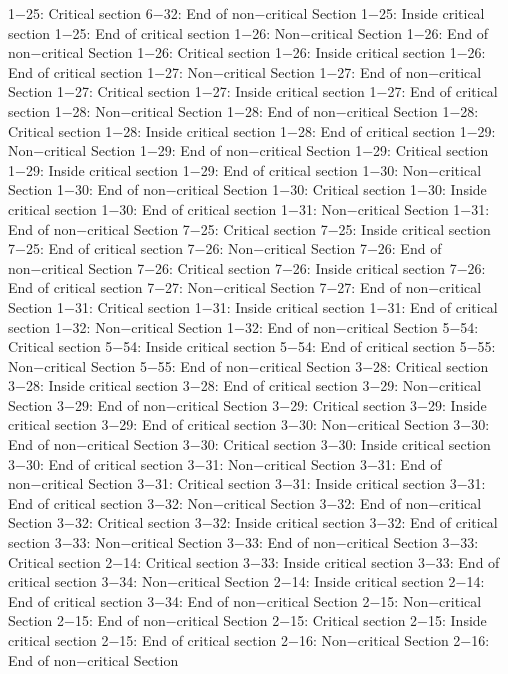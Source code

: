 1−25: Critical section
6−32: End of non−critical Section
1−25: Inside critical section
1−25: End of critical section
1−26: Non−critical Section
1−26: End of non−critical Section
1−26: Critical section
1−26: Inside critical section
1−26: End of critical section
1−27: Non−critical Section
1−27: End of non−critical Section
1−27: Critical section
1−27: Inside critical section
1−27: End of critical section
1−28: Non−critical Section
1−28: End of non−critical Section
1−28: Critical section
1−28: Inside critical section
1−28: End of critical section
1−29: Non−critical Section
1−29: End of non−critical Section
1−29: Critical section
1−29: Inside critical section
1−29: End of critical section
1−30: Non−critical Section
1−30: End of non−critical Section
1−30: Critical section
1−30: Inside critical section
1−30: End of critical section
1−31: Non−critical Section
1−31: End of non−critical Section
7−25: Critical section
7−25: Inside critical section
7−25: End of critical section
7−26: Non−critical Section
7−26: End of non−critical Section
7−26: Critical section
7−26: Inside critical section
7−26: End of critical section
7−27: Non−critical Section
7−27: End of non−critical Section
1−31: Critical section
1−31: Inside critical section
1−31: End of critical section
1−32: Non−critical Section
1−32: End of non−critical Section
5−54: Critical section
5−54: Inside critical section
5−54: End of critical section
5−55: Non−critical Section
5−55: End of non−critical Section
3−28: Critical section
3−28: Inside critical section
3−28: End of critical section
3−29: Non−critical Section
3−29: End of non−critical Section
3−29: Critical section
3−29: Inside critical section
3−29: End of critical section
3−30: Non−critical Section
3−30: End of non−critical Section
3−30: Critical section
3−30: Inside critical section
3−30: End of critical section
3−31: Non−critical Section
3−31: End of non−critical Section
3−31: Critical section
3−31: Inside critical section
3−31: End of critical section
3−32: Non−critical Section
3−32: End of non−critical Section
3−32: Critical section
3−32: Inside critical section
3−32: End of critical section
3−33: Non−critical Section
3−33: End of non−critical Section
3−33: Critical section
2−14: Critical section
3−33: Inside critical section
3−33: End of critical section
3−34: Non−critical Section
2−14: Inside critical section
2−14: End of critical section
3−34: End of non−critical Section
2−15: Non−critical Section
2−15: End of non−critical Section
2−15: Critical section
2−15: Inside critical section
2−15: End of critical section
2−16: Non−critical Section
2−16: End of non−critical Section
